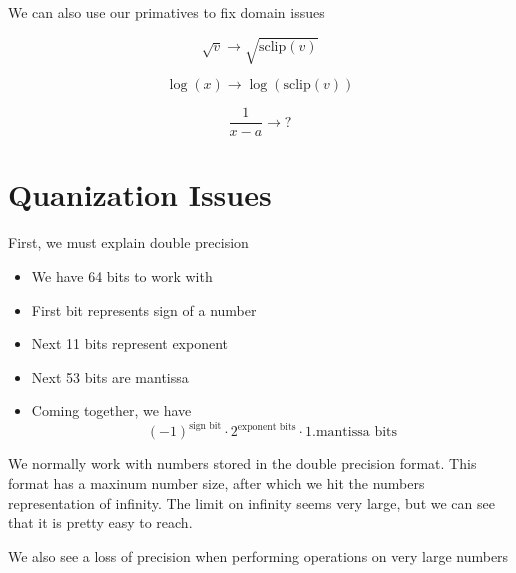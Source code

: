 \documentclass{report}
\begin{document}
We can also use our primatives to fix domain issues
\begin{example}
    \begin{equation*}
        \sqrt{v} \rightarrow \sqrt{\mathrm{sclip}(v)}
    \end{equation*}
\end{example}

\begin{example}
    \begin{equation*}
        \log (x) \rightarrow \log (\mathrm{sclip}(v))
    \end{equation*}
\end{example}


\begin{example}
    \begin{equation*}
        \frac{1}{x - a} \rightarrow ?
    \end{equation*}
\end{example}

\section{Quanization Issues}
First, we must explain double precision
\begin{itemize}
    \item We have 64 bits to work with
    \item First bit represents sign of a number
    \item Next 11 bits represent exponent
    \item Next 53 bits are mantissa
    \item Coming together, we have
    \begin{equation*}
        (-1)^{\text{sign bit}} \cdot 2^{\text{exponent bits}} \cdot 1.\text{mantissa bits}
    \end{equation*}
\end{itemize}
We normally work with numbers stored in the double precision format. This format has a maxinum number size, after which we hit the numbers representation of infinity. 
The limit on infinity seems very large, but we can see that it is pretty easy to reach.
\begin{example}
\end{example}
We also see a loss of precision when performing operations on very large numbers
\begin{example}
\end{example}
\end{document}

